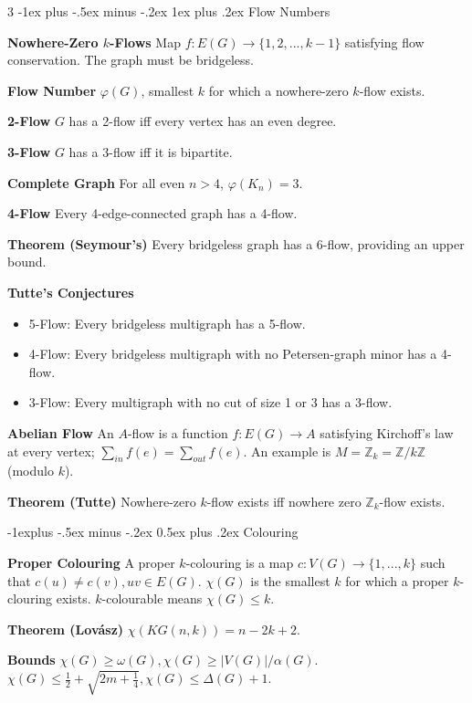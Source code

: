 \documentclass[10pt, landscape]{article}
\makeatletter
\renewcommand{\section}{\@startsection{section}{1}{0mm}%
                                {-1ex plus -.5ex minus -.2ex}%
                                {0.5ex plus .2ex}%
                                {\normalfont\large\bfseries}}
\renewcommand{\section}{\@startsection{section}{2}{0mm}%
                                {-1explus -.5ex minus -.2ex}%
                                {0.5ex plus .2ex}%
                                {\normalfont\normalsize\bfseries}}
\renewcommand{\subsection}{\@startsection{subsection}{3}{0mm}%
                                {-1ex plus -.5ex minus -.2ex}%
                                {1ex plus .2ex}%
                                {\normalfont\small\bfseries}}%
\makeatother
\begin{document}
\begin{multicols*}{3}
\subsection{Flow Numbers}

\textbf{Nowhere-Zero $k$-Flows} Map $f:E(G) \rightarrow \{1,2,...,k-1\}$ satisfying flow conservation. The graph must be bridgeless.

\textbf{Flow Number} $\varphi(G)$, smallest $k$ for which a nowhere-zero $k$-flow exists.

\textbf{2-Flow} $G$ has a 2-flow iff every vertex has an even degree.

\textbf{3-Flow} $G$ has a 3-flow iff it is bipartite.

\textbf{Complete Graph} For all even $n>4$, $\varphi(K_n)=3$.

\textbf{4-Flow} Every 4-edge-connected graph has a 4-flow.

\textbf{Theorem (Seymour's)} Every bridgeless graph has a 6-flow, providing an upper bound.

\textbf{Tutte's Conjectures}
\begin{itemize}
    \item 5-Flow: Every bridgeless multigraph has a 5-flow.
    \item 4-Flow: Every bridgeless multigraph with no Petersen-graph minor has a 4-flow.
    \item 3-Flow: Every multigraph with no cut of size 1 or 3 has a 3-flow.
\end{itemize}

\textbf{Abelian Flow} An $A$-flow is a function $f:E(G) \rightarrow A$ satisfying Kirchoff's law at every vertex; $\sum_{in} f(e)=\sum_{out} f(e)$. An example is $M=\mathbb{Z}_k=\mathbb{Z}/ k \mathbb{Z}$ (modulo $k$).

\textbf{Theorem (Tutte)} Nowhere-zero $k$-flow exists iff nowhere zero $\mathbb{Z}_k$-flow exists.

\section{Colouring}

\textbf{Proper Colouring} A proper $k$-colouring is a map $c:V(G) \rightarrow \{1,...,k\}$ such that $c(u) \neq c(v), uv \in E(G)$. $\chi(G)$ is the smallest $k$ for which a proper $k$-clouring exists. $k$-colourable means $\chi(G) \leq k$.

\textbf{Theorem (Lovász)} $\chi(KG(n, k))=n-2k+2$.

\textbf{Bounds} $\chi(G) \geq \omega(G), \chi(G) \geq |V(G)|/\alpha(G)$. $\chi(G) \leq \frac{1}{2}+\sqrt{2m+\frac{1}{4}}, \chi(G) \leq \Delta(G)+1$.


\end{multicols*}
\end{document}
